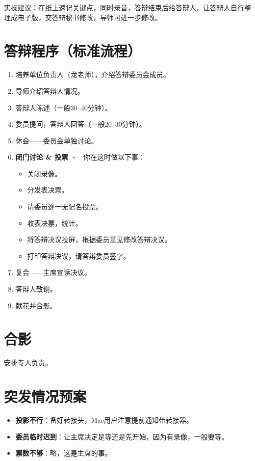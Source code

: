 \documentclass[12pt,a4paper,openany]{ctexbook}
\begin{document}
\begin{tipbox}
实操建议：在纸上速记关键点，同时录音，答辩结束后给答辩人，让答辩人自行整理成电子版，交答辩秘书修改，导师可进一步修改。
\end{tipbox}

\section{答辩程序（标准流程）}

\begin{enumerate}
  \item 培养单位负责人（龙老师），介绍答辩委员会成员。
  \item 导师介绍答辩人情况。
  \item 答辩人陈述（一般30--40分钟）。
  \item 委员提问，答辩人回答（一般20--30分钟）。
  \item 休会——委员会单独讨论。
  \item \textbf{闭门讨论 \& 投票} $\leftarrow$ 你在这时做以下事：
  \begin{itemize}
    \item 关闭录像。
    \item 分发表决票。
    \item 请委员逐一无记名投票。
    \item 收表决票，统计。
    \item 将答辩决议投屏，根据委员意见修改答辩决议。
    \item 打印答辩决议，请答辩委员签字。
  \end{itemize}
  \item 复会——主席宣读决议。
  \item 答辩人致谢。
  \item 献花并合影。
\end{enumerate}

\section{合影}

安排专人负责。

\section{突发情况预案}

\begin{itemize}
  \item \textbf{投影不行}：备好转接头，Mac用户注意提前通知带转接器。
  \item \textbf{委员临时迟到}：让主席决定是等还是先开始，因为有录像，一般要等。
  \item \textbf{票数不够}：略，这是主席的事。
\end{itemize}
\end{document}
